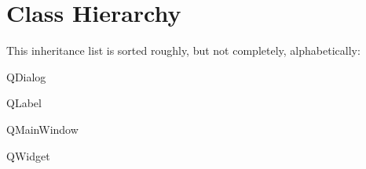 \section{Class Hierarchy}
This inheritance list is sorted roughly, but not completely, alphabetically\+:\begin{DoxyCompactList}
\item {}
\item Q\+Dialog\begin{DoxyCompactList}
\item {}
\end{DoxyCompactList}
\item Q\+Label\begin{DoxyCompactList}
\item {}
\end{DoxyCompactList}
\item Q\+Main\+Window\begin{DoxyCompactList}
\item {}
\end{DoxyCompactList}
\item Q\+Widget\begin{DoxyCompactList}
\item {}
\item {}
\end{DoxyCompactList}
\end{DoxyCompactList}
